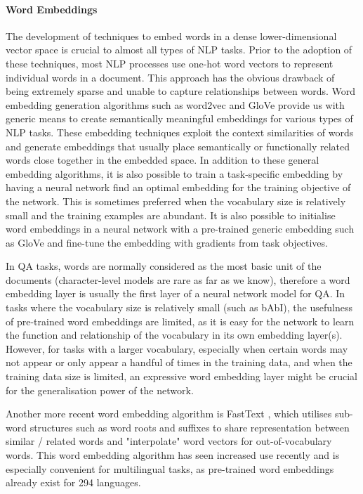 \documentclass[]{article}
\begin{document}
\paragraph{Word Embeddings}
The development of techniques to embed words in a dense lower-dimensional vector space is crucial to almost all types of NLP tasks. Prior to the adoption of these techniques, most NLP processes use one-hot word vectors to represent individual words in a document. This approach has the obvious drawback of being extremely sparse and unable to capture relationships between words. Word embedding generation algorithms such as word2vec \cite{mikolov2013efficient} and GloVe \cite{pennington2014glove} provide us with generic means to create semantically meaningful embeddings for various types of NLP tasks. These embedding techniques exploit the context similarities of words and generate embeddings that usually place semantically or functionally related words close together in the embedded space. 
In addition to these general embedding algorithms, it is also possible to train a task-specific embedding by having a neural network find an optimal embedding for the training objective of the network. This is sometimes preferred when the vocabulary size is relatively small and the training examples are abundant. It is also possible to initialise word embeddings in a neural network with a pre-trained generic embedding such as GloVe and fine-tune the embedding with gradients from task objectives. 

In QA tasks, words are normally considered as the most basic unit of the documents (character-level models are rare as far as we know), therefore a word embedding layer is usually the first layer of a neural network model for QA. In tasks where the vocabulary size is relatively small (such as bAbI), the usefulness of pre-trained word embeddings are limited, as it is easy for the network to learn the function and relationship of the vocabulary in its own embedding layer(s). However, for tasks with a larger vocabulary, especially when certain words may not appear or only appear a handful of times in the training data, and when the training data size is limited, an expressive word embedding layer might be crucial for the generalisation power of the network. 

Another more recent word embedding algorithm is FastText \cite{bojanowski2016enriching}, which utilises sub-word structures such as word roots and suffixes to share representation between similar / related words and "interpolate" word vectors for out-of-vocabulary words. This word embedding algorithm has seen increased use recently and is especially convenient for multilingual tasks, as pre-trained word embeddings already exist for 294 languages.
\end{document}
